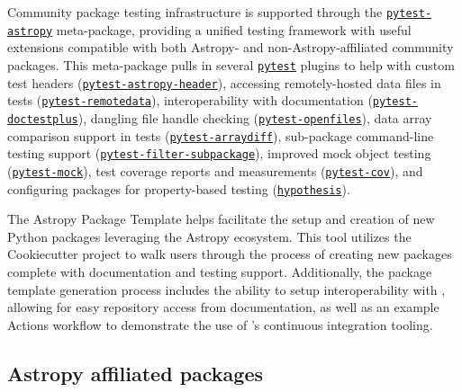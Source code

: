 \documentclass[modern]{aastex631}
\newcommand{\secauthor}[1]{{\color{blue}Author:~\textit{#1}}}
\begin{document}
Community package testing infrastructure is supported through the
\href{https://github.com/astropy/pytest-astropy}{\texttt{pytest-astropy}}
meta-package, providing a unified testing framework with useful extensions
compatible with both Astropy- and non-Astropy-affiliated community packages.
This meta-package pulls in several
\href{https://github.com/pytest-dev/pytest}{\texttt{pytest}} plugins to help
with custom test headers
(\href{https://github.com/astropy/pytest-astropy-header}{\texttt{pytest-astropy-header}}),
accessing remotely-hosted data files in tests
(\href{https://github.com/astropy/pytest-remotedata}{\texttt{pytest-remotedata}}),
interoperability with documentation
(\href{https://github.com/astropy/pytest-doctestplus}{\texttt{pytest-doctestplus}}),
dangling file handle checking
(\href{https://github.com/astropy/pytest-openfiles}{\texttt{pytest-openfiles}}),
data array comparison support in tests
(\href{https://github.com/astropy/pytest-arraydiff}{\texttt{pytest-arraydiff}}),
sub-package command-line testing support
(\href{https://github.com/astropy/pytest-filter-subpackage}{\texttt{pytest-filter-subpackage}}),
improved mock object testing
(\href{https://github.com/pytest-dev/pytest-mock}{\texttt{pytest-mock}}), test
coverage reports and measurements
(\href{https://github.com/pytest-dev/pytest-cov}{\texttt{pytest-cov}}), and
configuring packages for property-based testing
(\href{https://github.com/HypothesisWorks/hypothesis}{\texttt{hypothesis}}).

The Astropy Package Template helps facilitate the setup and creation of new
Python packages leveraging the Astropy ecosystem. This tool utilizes the
Cookiecutter project to walk users through the process of creating new
packages complete with documentation and testing support. Additionally, the
package template generation process includes the ability to setup
interoperability with \github, allowing for easy repository access from
documentation, as well as an example \github Actions workflow to demonstrate
the use of \github's continuous integration tooling.

\subsection{Astropy affiliated packages}


\end{document}
